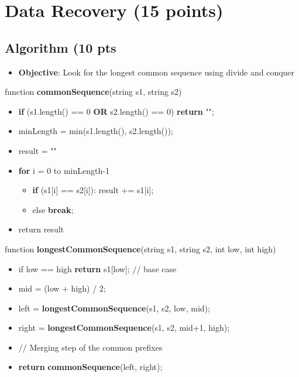 \documentclass{article}[12pt]
\begin{document}
\newpage
\section{Data Recovery (15 points)}
\subsection{Algorithm (10 pts}

\begin{itemize}
  \item \textbf{Objective}: Look for the longest common sequence
    using divide and conquer 
\end{itemize}

function \textbf{commonSequence}(string s1, string s2)
\begin{itemize}
  \item \textbf{if} (s1.length() == 0 \textbf{OR} s2.length() == 0) \textbf{return} "";
  \item minLength = min(s1.length(), s2.length());
  \item result = ""
  \item \textbf{for} i = 0 to minLength-1
    \begin{itemize}
      \item \textbf{if} (s1[i] == s2[i]): result += s1[i];
      \item else \textbf{break};
    \end{itemize}
  \item return result
\end{itemize}

function \textbf{longestCommonSequence}(string s1, string s2, int low, int high)
\begin{itemize}
  \item if low == high \textbf{return} s1[low]; $//$ base case
  \item mid = (low + high) / 2;
  \item left = \textbf{longestCommonSequence}(s1, s2, low, mid);
  \item right = \textbf{longestCommonSequence}(s1, s2, mid+1, high);

  \item $//$ Merging step of the common prefixes
  \item \textbf{return} \textbf{commonSequence}(left, right);
\end{itemize}

\vspace*{10px}
\end{document}
